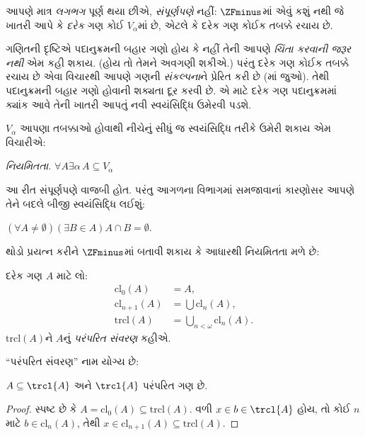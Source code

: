 \documentclass[../../../include/open-logic-section]{subfiles}
\begin{document}


આપણે માત્ર \emph{લગભગ} પૂર્ણ થયા છીએ, \emph{સંપૂર્ણપણે}
નહીં: $\ZFminus$માં એવું કશું નથી જે ખાતરી આપે કે
\emph{દરેક} ગણ કોઈ $V_\alpha$માં છે, એટલે કે દરેક ગણ કોઈક
તબક્કે રચાય છે.

ગણિતની દૃષ્ટિએ પદાનુક્રમની બહાર ગણો હોય કે નહીં તેની આપણે
\emph{ચિંતા કરવાની જરૂર નથી} એમ કહી શકાય. (હોય તો તેમને
અવગણી શકીએ.) પરંતુ દરેક ગણ કોઈક તબક્કે રચાય છે એવા વિચારથી
આપણે ગણની \emph{સંકલ્પના}ને પ્રેરિત કરી છે
(માં \stageshier{} જુઓ). તેથી
પદાનુક્રમની બહાર ગણો હોવાની શક્યતા દૂર કરવી છે. એ માટે
દરેક ગણ પદાનુક્રમમાં ક્યાંક આવે તેની ખાતરી આપતું નવી
સ્વયંસિદ્ધિ ઉમેરવી પડશે.

$V_\alpha$ આપણા તબક્કાઓ હોવાથી નીચેનું સીધું જ સ્વયંસિદ્ધિ
તરીકે ઉમેરી શકાય એમ વિચારીએ:

\begin{defish}
\emph{નિયમિતતા.} $\forall A \exists \alpha\, A \subseteq V_\alpha$
\end{defish}

આ રીત સંપૂર્ણપણે વાજબી હોત. પરંતુ આગળના વિભાગમાં સમજાવાનાં
કારણોસર આપણે તેને બદલે બીજી સ્વયંસિદ્ધિ લઈશું:

\begin{axiom}[આધાર]
$(\forall A \neq \emptyset)(\exists B \in A)A \cap B = \emptyset$.
\end{axiom}

થોડો પ્રયત્ન કરીને $\ZFminus$માં બતાવી શકાય કે આધારથી
નિયમિતતા મળે છે:
\begin{defn}
દરેક ગણ $A$ માટે લો:
\begin{align*}
	\text{cl}_0(A) &= A,\\
	\text{cl}_{n+1}(A) &= \bigcup \text{cl}_n(A),\\
	\text{trcl}(A) &= \bigcup_{n < \omega} \text{cl}_{n}(A).
\end{align*}
$\text{trcl}(A)$ને $A$નું \emph{પરંપરિત સંવરણ} કહીએ.
\end{defn}
\noindent
``પરંપરિત સંવરણ'' નામ યોગ્ય છે:
\begin{prop}
$A \subseteq \trcl{A}$ અને $\trcl{A}$ પરંપરિત ગણ છે.
\end{prop}

\begin{proof}
સ્પષ્ટ છે કે $A = \text{cl}_0(A) \subseteq \text{trcl}(A)$.
વળી $x
\in b \in \trcl{A}$ હોય, તો કોઈ $n$ માટે
$b \in \text{cl}_n(A)$, તેથી $x
\in \text{cl}_{n+1}(A) \subseteq \text{trcl}(A)$.
\end{proof}
\end{document}
